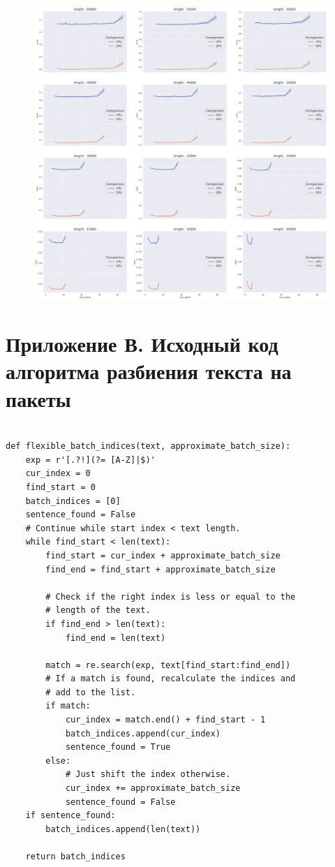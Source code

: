 \begin{figure}[h]
\centering
\includegraphics[width=\textwidth]{img/num_CPU_vs_GPU_Grid}
\end{figure}

\newpage
\section*{Приложение В. Исходный код  алгоритма разбиения текста на  пакеты}
\label{sec:code}

\begin{ListingEnv}[h]
\begin{lstlisting}

def flexible_batch_indices(text, approximate_batch_size):
    exp = r'[.?!](?= [A-Z]|$)'
    cur_index = 0
    find_start = 0
    batch_indices = [0]
    sentence_found = False
    # Continue while start index < text length.
    while find_start < len(text):
        find_start = cur_index + approximate_batch_size
        find_end = find_start + approximate_batch_size

        # Check if the right index is less or equal to the 
        # length of the text.
        if find_end > len(text):
            find_end = len(text)
     
        match = re.search(exp, text[find_start:find_end])
        # If a match is found, recalculate the indices and 
        # add to the list.
        if match:
            cur_index = match.end() + find_start - 1
            batch_indices.append(cur_index)
            sentence_found = True
        else:
            # Just shift the index otherwise.
            cur_index += approximate_batch_size
            sentence_found = False
    if sentence_found:
        batch_indices.append(len(text))
        
    return batch_indices
\end{lstlisting}
\end{ListingEnv}





